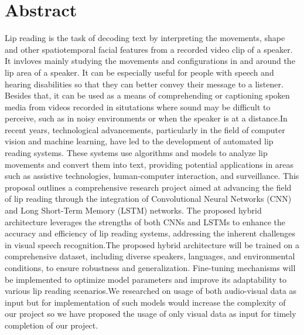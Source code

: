 		\large
			\chapter*{Abstract}
		\normalsize
		
		Lip reading is the task of decoding text by interpreting the movements, shape and other spatiotemporal facial features from  a recorded video clip of a speaker. It invloves mainly studying the movements and configurations in and around the lip area of a speaker. It can be especially useful for people with speech and hearing disabilities so that they can better convey their message to a listener. Besides that, it can be used as a means of comprehending or captioning spoken media from videos recorded in situtations where sound may be difficult to perceive, such as in noisy environments or when the speaker is at a distance.In recent years, technological advancements, particularly in the field of computer vision and machine learning, have led to the development of automated lip reading systems. These systems use algorithms and models to analyze lip movements and convert them into text, providing potential applications in areas such as assistive technologies, human-computer interaction, and surveillance. This proposal outlines a comprehensive research project aimed at advancing the field of lip reading through the integration of Convolutional Neural Networks (CNN) and Long Short-Term Memory (LSTM) networks. The proposed hybrid architecture leverages the strengths of both CNNs and LSTMs to enhance the accuracy and efficiency of lip reading systems, addressing the inherent challenges in visual speech recognition.The proposed hybrid architecture will be trained on a comprehensive dataset, including diverse speakers, languages, and environmental conditions, to ensure robustness and generalization. Fine-tuning mechanisms will be implemented to optimize model parameters and improve its adaptability to various lip reading scenarios.We researched on usage of both audio-visual data as input but for implementation of such models would increase the complexity of our project so we have proposed the usage of only visual data as input for timely completion of our project.
				
	\tableofcontents
		
	\listoffigures
		
	\pagebreak
	
	
		\Large
			\begingroup
				\let\clearpage\relax
